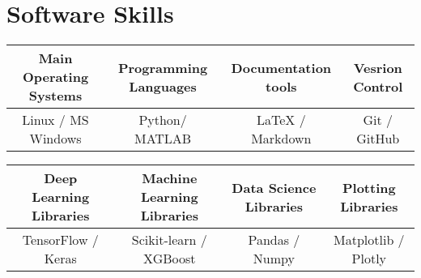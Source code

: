 \documentclass[letterpaper,11pt]{article}
\begin{document}
\section{Software Skills}

\begin{table}[h!]
  \begin{center}
    \label{tab:table1}
    \begin{tabular}{c|c|c|c}
      Main Operating Systems \hspace{5pt} & \hspace{5pt} Programming Languages \hspace{5pt} & \hspace{5pt} Documentation tools \hspace{5pt} & \hspace{5pt} Vesrion Control \\
      \hline
      Linux / MS Windows & Python/ MATLAB & LaTeX / Markdown & Git / GitHub \\
    \end{tabular}
  \end{center}
\end{table}

\vspace{-20pt}

\begin{table}[h!]
  \begin{center}
    \label{tab:table1}
    \begin{tabular}{c|c|c|c}
      Deep Learning Libraries \hspace{5pt} & \hspace{5pt} Machine Learning Libraries \hspace{5pt} & \hspace{5pt} Data Science Libraries \hspace{5pt} & \hspace{5pt} Plotting Libraries \hspace{5pt} \\
      \hline
      TensorFlow / Keras & Scikit-learn / XGBoost & Pandas / Numpy & Matplotlib / Plotly \\
    \end{tabular}
  \end{center}
\end{table}

\vspace{-20pt}
\end{document}

